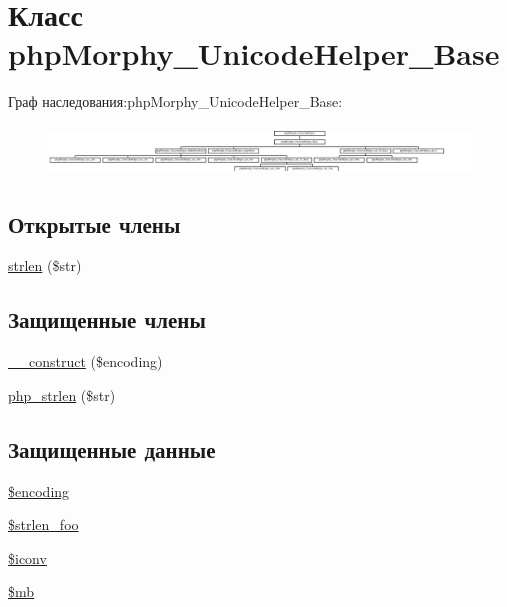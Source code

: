 \hypertarget{classphpMorphy__UnicodeHelper__Base}{
\section{Класс phpMorphy\_\-UnicodeHelper\_\-Base}
\label{classphpMorphy__UnicodeHelper__Base}
}
Граф наследования:phpMorphy\_\-UnicodeHelper\_\-Base:\begin{figure}[H]
\begin{center}
\leavevmode
\includegraphics[height=1.315789cm]{classphpMorphy__UnicodeHelper__Base}
\end{center}
\end{figure}
\subsection*{Открытые члены}
\begin{DoxyCompactItemize}
\item 
\hyperlink{classphpMorphy__UnicodeHelper__Base_afa54f68ea468297e6e4d75f5e95f85e7}{strlen} (\$str)
\end{DoxyCompactItemize}
\subsection*{Защищенные члены}
\begin{DoxyCompactItemize}
\item 
\hyperlink{classphpMorphy__UnicodeHelper__Base_aa37cadf034734da3089267477eefca73}{\_\-\_\-construct} (\$encoding)
\item 
\hyperlink{classphpMorphy__UnicodeHelper__Base_a938a13bc7c6f350482a754a2d6abceef}{php\_\-strlen} (\$str)
\end{DoxyCompactItemize}
\subsection*{Защищенные данные}
\begin{DoxyCompactItemize}
\item 
\hyperlink{classphpMorphy__UnicodeHelper__Base_af33d0852c7eb485b94c506a32d52ccab}{\$encoding}
\item 
\hyperlink{classphpMorphy__UnicodeHelper__Base_ae658a5cb8299d103d917948753605c7a}{\$strlen\_\-foo}
\item 
\hyperlink{classphpMorphy__UnicodeHelper__Base_a967f83763bccb73c95e8878e579b26f6}{\$iconv}
\item 
\hyperlink{classphpMorphy__UnicodeHelper__Base_a0765bdee56eb970e53d7c6c233ae7a6d}{\$mb}
\end{DoxyCompactItemize}
